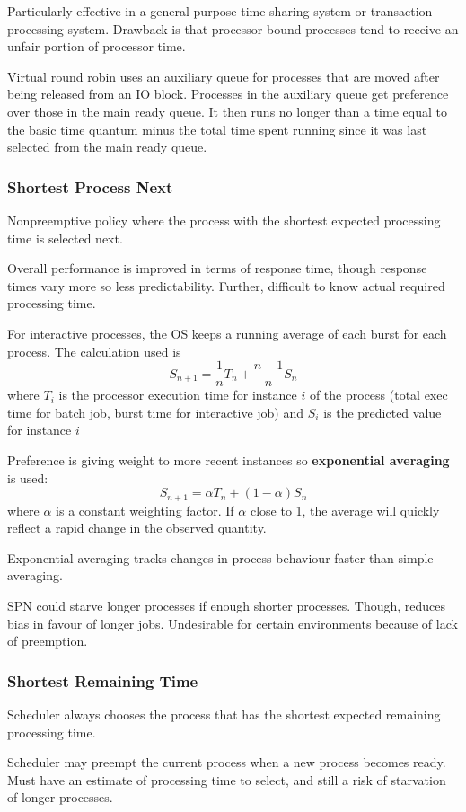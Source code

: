 \documentclass[11pt]{article}
\begin{document}
Particularly effective in a general-purpose time-sharing system or transaction
processing system. Drawback is that processor-bound processes tend to receive an
unfair portion of processor time.

Virtual round robin uses an auxiliary queue for processes that are moved after
being released from an IO block. Processes in the auxiliary queue get preference
over those in the main ready queue. It then runs no longer than a time equal to
the basic time quantum minus the total time spent running since it was last
selected from the main ready queue.
\subsubsection{Shortest Process Next}
\label{sec:orgf1c8781}
Nonpreemptive policy where the process with the shortest expected processing
time is selected next.

Overall performance is improved in terms of response time, though response times
vary more so less predictability.
Further, difficult to know actual required processing time.

For interactive processes, the OS keeps a running average of each burst for
each process. The calculation used is
$$
S_{n+1} = \frac{1}{n} T_{n} + \frac{n-1}{n} S_{n}
$$
where \(T_{i}\) is the processor execution time for instance \(i\) of the process
(total exec time for batch job, burst time for interactive job) and
\(S_{i}\) is the predicted value for instance \(i\)

Preference is giving weight to more recent instances so \textbf{exponential averaging}
is used:
$$
S_{n+1} = \alpha T_{n} + (1 - \alpha) S_{n}
$$
where \(\alpha\) is a constant weighting factor. If \(\alpha\) close to 1, the
average will quickly reflect a rapid change in the observed quantity.

Exponential averaging tracks changes in process behaviour faster than simple
averaging.

SPN could starve longer processes if enough shorter processes. Though, reduces
bias in favour of longer jobs. Undesirable for certain environments because of
lack of preemption.
\subsubsection{Shortest Remaining Time}
\label{sec:org24a67a7}
Scheduler always chooses the process that has the shortest expected remaining processing
time.

Scheduler may preempt the current process when a new process becomes ready. Must have an
estimate of processing time to select, and still a risk of starvation of longer
processes.
\end{document}
